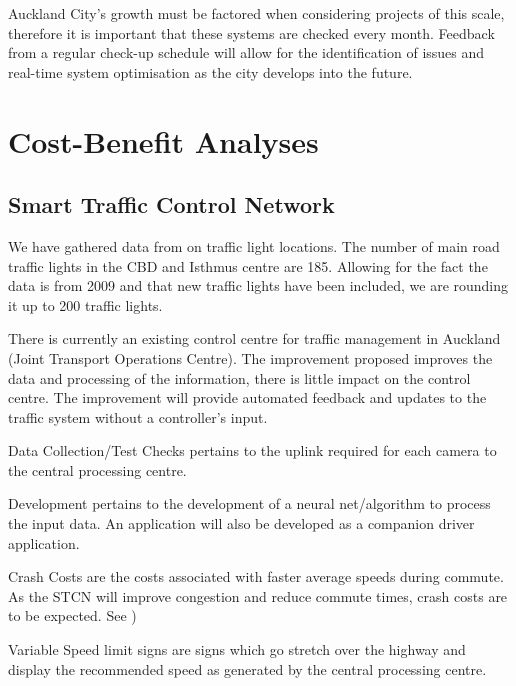 \documentclass[twoside, a4paper, 11pt]{article}
\renewcommand\thesection{\arabic{section}.0}
\renewcommand\thesubsection{\arabic{section}.\arabic{subsection}}
\begin{document}
Auckland City's growth must be factored when considering projects of this scale, therefore it is important that these systems are checked every month. Feedback from a regular check-up schedule will allow for the identification of issues and real-time system optimisation as the city develops into the future.


\newpage
\printbibliography[title=List of References]


\newpage
\appendix
\renewcommand{\thesection}{Appendix \Alph{section}}
\renewcommand{\thesubsection}{Appendix \Alph{section}.\arabic{subsection}}


\section{Cost-Benefit Analyses}
\subsection{Smart Traffic Control Network}
We have gathered data from \citep{chan17} on traffic light locations. The number of main road traffic lights in the CBD and Isthmus centre are 185. Allowing for the fact the data is from 2009 and that new traffic lights have been included, we are rounding it up to 200 traffic lights. 

There is currently an existing control centre for traffic management in Auckland (Joint Transport Operations Centre). The improvement proposed improves the data and processing of the information, there is little impact on the control centre. The improvement will provide automated feedback and updates to the traffic system without a controller's input.

Data Collection/Test Checks pertains to the uplink required for each camera to the central processing centre.

Development pertains to the development of a neural net/algorithm to process the input data. An application will also be developed as a companion driver application.

Crash Costs are the costs associated with faster average speeds during commute. As the STCN will improve congestion and reduce commute times, crash costs are to be expected. See \cite[p.~45]{wallis15})

Variable Speed limit signs are signs which go stretch over the highway and display the recommended speed as generated by the central processing centre. 
\end{document}

